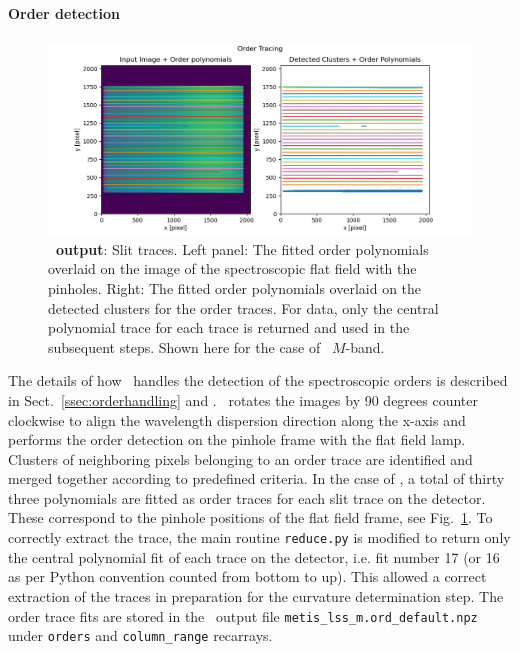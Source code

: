 \paragraph{Order detection}\label{sec:critalg_orderdet}

\begin{figure}[!ht]
  \centering
  \includegraphics[width=\textwidth]{figures/LSS_CrtAlg_files/Figure_4.png}
  \caption{\textbf{\pyred~output}: Slit traces. Left panel: The fitted order polynomials overlaid on the image of the spectroscopic flat field with the pinholes. Right: The fitted order polynomials overlaid on the detected clusters for the order traces. For \met data, only the central polynomial trace for each trace is returned and used in the subsequent steps. Shown here for the case of \lss~$M$-band. }
  \label{fig:fig3}
\end{figure}

The details of how \pyred~handles the detection of the spectroscopic orders is described in Sect.~\ref{ssec:orderhandling} and \cite{pis02, pis21}. 
\pyred~rotates the images by 90 degrees counter clockwise to align the wavelength dispersion direction along the x-axis and performs the order detection on the pinhole frame with the flat field lamp.  Clusters of neighboring pixels belonging to an order trace are identified  and merged together according to predefined criteria. In the case of \met, a total of thirty three polynomials are fitted as order traces for each slit trace on the detector. These correspond to the pinhole positions of the flat field frame, see Fig.~\ref{fig:fig3}. To correctly extract the trace, the main routine \texttt{reduce.py} is modified to return only the central polynomial fit of each trace on the detector, i.e. fit number 17 (or 16 as per Python convention counted from bottom to up). This allowed a correct extraction of the traces in preparation for the curvature determination step. The order trace fits are stored in the \pyred~output file \texttt{metis\_lss\_m.ord\_default.npz} under \texttt{orders} and \texttt{column\_range} recarrays.
